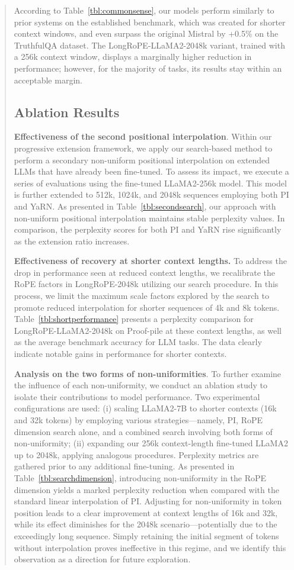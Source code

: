 \begin{abstract}
According to Table~\ref{tbl:commonsense}, our models perform similarly to prior systems on the established benchmark, which was created for shorter context windows, and even surpass the original Mistral by +0.5\% on the TruthfulQA dataset. The LongRoPE-LLaMA2-2048k variant, trained with a 256k context window, displays a marginally higher reduction in performance; however, for the majority of tasks, its results stay within an acceptable margin.

\subsection{Ablation Results}

\textbf{Effectiveness of the second positional interpolation}. Within our progressive extension framework, we apply our search-based method to perform a secondary non-uniform positional interpolation on extended LLMs that have already been fine-tuned. To assess its impact, we execute a series of evaluations using the fine-tuned LLaMA2-256k model. This model is further extended to 512k, 1024k, and 2048k sequences employing both PI and YaRN. As presented in Table~\ref{tbl:secondsearch}, our approach with non-uniform positional interpolation maintains stable perplexity values. In comparison, the perplexity scores for both PI and YaRN rise significantly as the extension ratio increases.

\textbf{Effectiveness of recovery at shorter context lengths.} To address the drop in performance seen at reduced context lengths, we recalibrate the RoPE factors in LongRoPE-2048k utilizing our search procedure. In this process, we limit the maximum scale factors explored by the search to promote reduced interpolation for shorter sequences of 4k and 8k tokens. Table~\ref{tbl:shortperformance} presents a perplexity comparison for LongRoPE-LLaMA2-2048k on Proof-pile at these context lengths, as well as the average benchmark accuracy for LLM tasks. The data clearly indicate notable gains in performance for shorter contexts.

\textbf{Analysis on the two forms of non-uniformities}. To further examine the influence of each non-uniformity, we conduct an ablation study to isolate their contributions to model performance. Two experimental configurations are used: (i) scaling LLaMA2-7B to shorter contexts (16k and 32k tokens) by employing various strategies—namely, PI, RoPE dimension search alone, and a combined search involving both forms of non-uniformity; (ii) expanding our 256k context-length fine-tuned LLaMA2 up to 2048k, applying analogous procedures. Perplexity metrics are gathered prior to any additional fine-tuning. As presented in Table~\ref{tbl:searchdimension}, introducing non-uniformity in the RoPE dimension yields a marked perplexity reduction when compared with the standard linear interpolation of PI. Adjusting for non-uniformity in token position leads to a clear improvement at context lengths of 16k and 32k, while its effect diminishes for the 2048k scenario—potentially due to the exceedingly long sequence. Simply retaining the initial segment of tokens without interpolation proves ineffective in this regime, and we identify this observation as a direction for future exploration.


\end{abstract}
